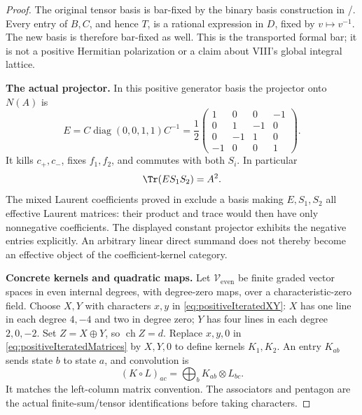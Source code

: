 \begin{proof}
The original tensor basis is bar-fixed by the binary
basis construction in /.
Every entry of \(B,C\), and hence \(T\), is a
rational expression in \(D\), fixed by
\(v\mapsto v^{-1}\). The new basis is therefore
bar-fixed as well. This is the transported formal bar;
it is not a positive Hermitian polarization or a
claim about VIII's global integral lattice.

\par\smallskip\noindent\textbf{The actual projector.}\quad
In this positive generator basis the projector onto
\(N(A)\) is
\begin{equation}\label{eq:positiveIteratedProjector}
 E=C\operatorname{diag}(0,0,1,1)C^{-1}
  =\frac12\begin{pmatrix}
   1&0&0&-1\\0&1&-1&0\\0&-1&1&0\\-1&0&0&1
  \end{pmatrix}.
\end{equation}
It kills \(c_+,c_-\), fixes \(f_1,f_2\), and
commutes with both \(S_i\). In particular
\[
                         \Tr(ES_1S_2)=A^2.
\]
The mixed Laurent coefficients proved in 
exclude a basis making \(E,S_1,S_2\) all effective
Laurent matrices: their product and trace would then
have only nonnegative coefficients.
The displayed constant projector exhibits the
negative entries explicitly.
An arbitrary linear direct summand does not thereby
become an effective object of the coefficient-kernel
category.

\par\smallskip\noindent\textbf{Concrete kernels and quadratic maps.}\quad
Let \(\mathcal V_{\mathrm{even}}\) be finite graded
vector spaces in even internal degrees, with
degree-zero maps, over a characteristic-zero field.
Choose \(X,Y\) with characters \(x,y\) in
\eqref{eq:positiveIteratedXY}:
\(X\) has one line in each degree \(4,-4\) and
two in degree zero; \(Y\) has four lines in each
degree \(2,0,-2\).
Set \(Z=X\oplus Y\), so \(\operatorname{ch}Z=d\).
Replace \(x,y,0\) in
\eqref{eq:positiveIteratedMatrices} by \(X,Y,0\)
to define kernels \(K_1,K_2\).
An entry \(K_{ab}\) sends state \(b\) to state
\(a\), and convolution is
\begin{equation}\label{eq:positiveIteratedConvolution}
                   (K\circ L)_{ac}
                         =\bigoplus_b K_{ab}\otimes L_{bc}.
\end{equation}
It matches the left-column matrix convention.
The associators and pentagon are the actual
finite-sum/tensor identifications before taking
characters.


\end{proof}
